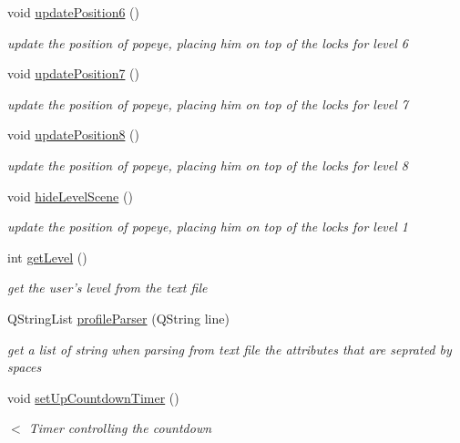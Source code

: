 \begin{DoxyCompactItemize}
void \hyperlink{classgame1scene_a2b67ed62aefbb5e10754ba7657bff0d7}{update\-Position6} ()
\begin{DoxyCompactList}\small\item\em update the position of popeye, placing him on top of the locks for level 6 \end{DoxyCompactList}\item 
void \hyperlink{classgame1scene_a1adc8653395a15f6d294533f7a1c198f}{update\-Position7} ()
\begin{DoxyCompactList}\small\item\em update the position of popeye, placing him on top of the locks for level 7 \end{DoxyCompactList}\item 
void \hyperlink{classgame1scene_ae3e9b32b16773b3bc3e8629f4f83a767}{update\-Position8} ()
\begin{DoxyCompactList}\small\item\em update the position of popeye, placing him on top of the locks for level 8 \end{DoxyCompactList}\item 
\hypertarget{classgame1scene_aeda24597082614afc55ff852b2056234}{void \hyperlink{classgame1scene_aeda24597082614afc55ff852b2056234}{hide\-Level\-Scene} ()}\label{classgame1scene_aeda24597082614afc55ff852b2056234}

\begin{DoxyCompactList}\small\item\em update the position of popeye, placing him on top of the locks for level 1 \end{DoxyCompactList}\item 
int \hyperlink{classgame1scene_a924b36e709b2d27ca49eb80f9c006f0d}{get\-Level} ()
\begin{DoxyCompactList}\small\item\em get the user's level from the text file \end{DoxyCompactList}\item 
Q\-String\-List \hyperlink{classgame1scene_afbff10ae72de024ecdb698ede372fd1f}{profile\-Parser} (Q\-String line)
\begin{DoxyCompactList}\small\item\em get a list of string when parsing from text file the attributes that are seprated by spaces \end{DoxyCompactList}\item 
void \hyperlink{classgame1scene_a42ece47541b47ca9a82864785cddf84c}{set\-Up\-Countdown\-Timer} ()
\begin{DoxyCompactList}\small\item\em $<$ Timer controlling the countdown \end{DoxyCompactList}\end{DoxyCompactItemize}
